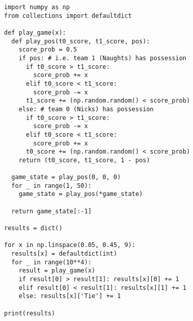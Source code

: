 \documentclass[11pt]{article} %
\begin{document}
\begin{verbatim}
import numpy as np
from collections import defaultdict

def play_game(x):
  def play_pos(t0_score, t1_score, pos):
    score_prob = 0.5
    if pos: # i.e. team 1 (Naughts) has possession
      if t0_score > t1_score:
        score_prob += x
      elif t0_score < t1_score:
        score_prob -= x
      t1_score += (np.random.random() < score_prob)
    else: # team 0 (Nicks) has possession
      if t0_score > t1_score:
        score_prob -= x
      elif t0_score < t1_score:
        score_prob += x
      t0_score += (np.random.random() < score_prob)
    return (t0_score, t1_score, 1 - pos)

  game_state = play_pos(0, 0, 0)
  for _ in range(1, 50):
    game_state = play_pos(*game_state)

  return game_state[:-1]

results = dict()

for x in np.linspace(0.05, 0.45, 9):
  results[x] = defaultdict(int)
  for _ in range(10**4):
    result = play_game(x)
    if result[0] > result[1]: results[x][0] += 1
    elif result[0] < result[1]: results[x][1] += 1
    else: results[x]['Tie'] += 1

print(results)
\end{verbatim}
\end{document}
